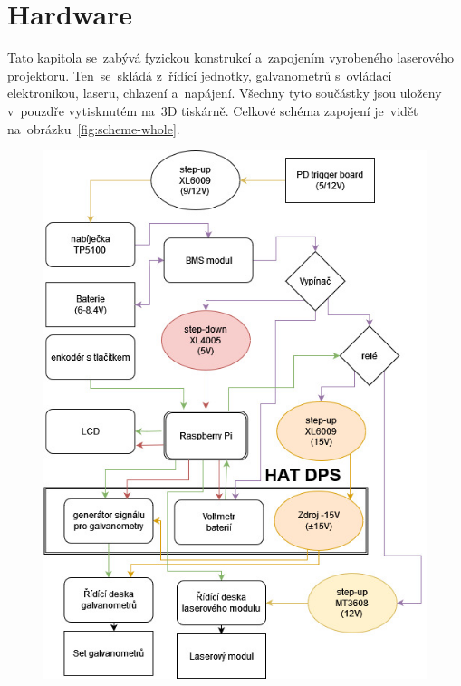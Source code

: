 \chapter{Hardware}
Tato kapitola se~zabývá fyzickou konstrukcí a~zapojením vyrobeného laserového projektoru.  Ten~se~skládá z~řídící jednotky, galvanometrů s~ovládací elektronikou, laseru, chlazení a~napájení. Všechny tyto součástky jsou uloženy v~pouzdře vytisknutém na~3D tiskárně. Celkové schéma zapojení  je~vidět  na~obrázku~\ref{fig:scheme-whole}.

\begin{figure}[H]
  \centering
  \includegraphics[width=\textwidth{}, trim=0 400 0 0, clip]{img/whole-scheme.jpg}
\end{figure}
\clearpage
